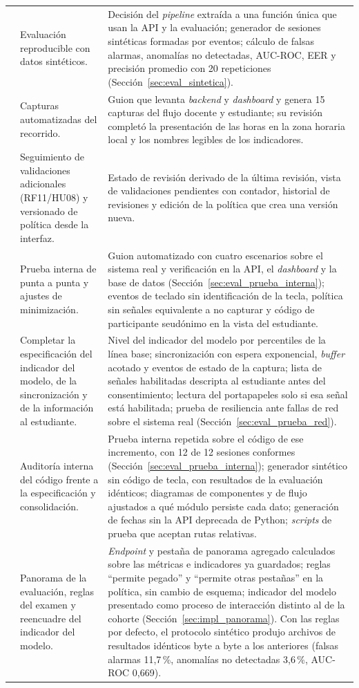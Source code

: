 {\begin{longtable}{>{\raggedright\arraybackslash}p{1.1cm} >{\raggedright\arraybackslash}p{3.7cm} >{\raggedright\arraybackslash}p{8.9cm}}
    6 & Evaluación reproducible con datos sintéticos. & Decisión del \textit{pipeline} extraída a una función única que usan la API y la evaluación; generador de sesiones sintéticas formadas por eventos; cálculo de falsas alarmas, anomalías no detectadas, AUC-ROC, EER y precisión promedio con 20 repeticiones (Sección~\ref{sec:eval_sintetica}). \\
    7 & Capturas automatizadas del recorrido. & Guion que levanta \textit{backend} y \textit{dashboard} y genera 15 capturas del flujo docente y estudiante; su revisión completó la presentación de las horas en la zona horaria local y los nombres legibles de los indicadores. \\
    8 & Seguimiento de validaciones adicionales (RF11/HU08) y versionado de política desde la interfaz. & Estado de revisión derivado de la última revisión, vista de validaciones pendientes con contador, historial de revisiones y edición de la política que crea una versión nueva. \\
    9 & Prueba interna de punta a punta y ajustes de minimización. & Guion automatizado con cuatro escenarios sobre el sistema real y verificación en la API, el \textit{dashboard} y la base de datos (Sección~\ref{sec:eval_prueba_interna}); eventos de teclado sin identificación de la tecla, política sin señales equivalente a no capturar y código de participante seudónimo en la vista del estudiante. \\
    10 & Completar la especificación del indicador del modelo, de la sincronización y de la información al estudiante. & Nivel del indicador del modelo por percentiles de la línea base; sincronización con espera exponencial, \textit{buffer} acotado y eventos de estado de la captura; lista de señales habilitadas descripta al estudiante antes del consentimiento; lectura del portapapeles solo si esa señal está habilitada; prueba de resiliencia ante fallas de red sobre el sistema real (Sección~\ref{sec:eval_prueba_red}). \\
    11 & Auditoría interna del código frente a la especificación y consolidación. & Prueba interna repetida sobre el código de ese incremento, con 12 de 12 sesiones conformes (Sección~\ref{sec:eval_prueba_interna}); generador sintético sin código de tecla, con resultados de la evaluación idénticos; diagramas de componentes y de flujo ajustados a qué módulo persiste cada dato; generación de fechas sin la API deprecada de Python; \textit{scripts} de prueba que aceptan rutas relativas. \\
    12 & Panorama de la evaluación, reglas del examen y reencuadre del indicador del modelo. & \textit{Endpoint} y pestaña de panorama agregado calculados sobre las métricas e indicadores ya guardados; reglas ``permite pegado'' y ``permite otras pestañas'' en la política, sin cambio de esquema; indicador del modelo presentado como proceso de interacción distinto al de la cohorte (Sección~\ref{sec:impl_panorama}). Con las reglas por defecto, el protocolo sintético produjo archivos de resultados idénticos byte a byte a los anteriores (falsas alarmas 11,7\,\%, anomalías no detectadas 3,6\,\%, AUC-ROC 0,669). \\

\end{longtable}}
